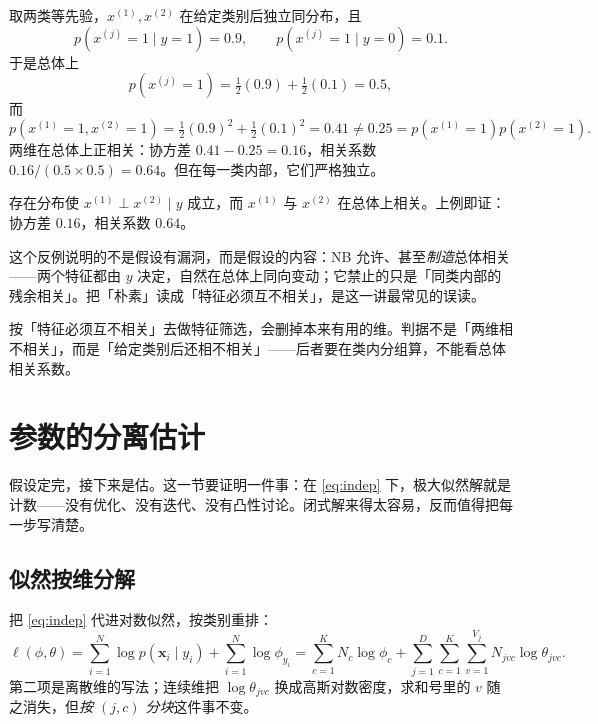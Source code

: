 \documentclass[11pt,a4paper,fontset=windows,zihao=-4]{ctexart}
\newcommand{\bx}{\mathbf{x}}
\begin{document}
取两类等先验，$x^{(1)},x^{(2)}$ 在给定类别后独立同分布，且
\[
  p(x^{(j)}=1\mid y=1)=0.9,\qquad p(x^{(j)}=1\mid y=0)=0.1 .
\]
于是总体上
\[
  p(x^{(j)}=1)=\tfrac12(0.9)+\tfrac12(0.1)=0.5,
\]
而
\[
  p(x^{(1)}=1,x^{(2)}=1)=\tfrac12(0.9)^2+\tfrac12(0.1)^2=0.41\ne 0.25=p(x^{(1)}=1)p(x^{(2)}=1).
\]
两维在总体上正相关：协方差 $0.41-0.25=0.16$，相关系数 $0.16/(0.5\times0.5)=0.64$。但在每一类内部，它们严格独立。

\begin{prop}[条件独立不蕴含边缘独立]
存在分布使 $x^{(1)}\perp x^{(2)}\mid y$ 成立，而 $x^{(1)}$ 与 $x^{(2)}$ 在总体上相关。上例即证：协方差 $0.16$，相关系数 $0.64$。
\end{prop}

这个反例说明的不是假设有漏洞，而是假设的内容：NB 允许、甚至\emph{制造}总体相关——两个特征都由 $y$ 决定，自然在总体上同向变动；它禁止的只是「同类内部的残余相关」。把「朴素」读成「特征必须互不相关」，是这一讲最常见的误读。

\begin{warn}[误读的代价]
按「特征必须互不相关」去做特征筛选，会删掉本来有用的维。判据不是「两维相不相关」，而是「给定类别后还相不相关」——后者要在类内分组算，不能看总体相关系数。
\end{warn}


\section{参数的分离估计}

假设定完，接下来是估。这一节要证明一件事：在 \eqref{eq:indep} 下，极大似然解就是计数——没有优化、没有迭代、没有凸性讨论。闭式解来得太容易，反而值得把每一步写清楚。

\subsection{似然按维分解}

把 \eqref{eq:indep} 代进对数似然，按类别重排：
\begin{equation}
  \ell(\phi,\theta)
  =\sum_{i=1}^{N}\log p(\bx_i\mid y_i)+\sum_{i=1}^{N}\log\phi_{y_i}
  =\sum_{c=1}^{K}N_c\log\phi_c
   +\sum_{j=1}^{D}\sum_{c=1}^{K}\sum_{v=1}^{V_j}N_{jvc}\log\theta_{jvc}.
  \label{eq:decomp}
\end{equation}
第二项是离散维的写法；连续维把 $\log\theta_{jvc}$ 换成高斯对数密度，求和号里的 $v$ 随之消失，但\emph{按 $(j,c)$ 分块}这件事不变。
\end{document}
